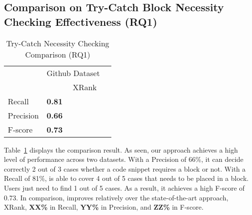 \subsection{Comparison on Try-Catch Block Necessity Checking Effectiveness (RQ1)}
\label{sec:rq1}

\begin{table}[t]%
  \caption{Try-Catch Necessity Checking Comparison (RQ1)}
  \vspace{-12pt}
	\begin{center}
		\renewcommand{\arraystretch}{1}
		\begin{tabular}{|p{1.5cm}<{\centering}|p{1.25cm}<{\centering}|p{1.25cm}<{\centering}|p{1.25cm}<{\centering}}
		  \hline
			\multirow{2}{*}{} & \multicolumn{2}{c|}{Github Dataset} \\
			\cline{2-3}
			  & \tool  & XRank \\
			\hline
			Recall    & \textbf{0.81} & \\
			Precision & \textbf{0.66} & \\
			F-score   & \textbf{0.73} & \\
			\hline
		\end{tabular}
		\label{tab:xblock}
	\end{center}
\end{table}


Table~\ref{tab:xblock} displays the comparison result. As seen, our
approach achieves a high level of performance across two
datasets. With a Precision of 66\%, it can decide correctly 2 out of 3
cases whether a code snippet requires a  block or
not. With a Recall of 81\%, {\tool} is able to cover 4 out of 5 cases
that needs to be placed in a  block. Users just need
to find 1 out of 5 cases. As a result, it achieves a high F-score of
0.73.
In comparison, {\tool} improves relatively over the state-of-the-art
approach, XRank, {\bf XX\%} in Recall, {\bf YY\%} in Precision, and
{\bf ZZ\%} in F-score.


